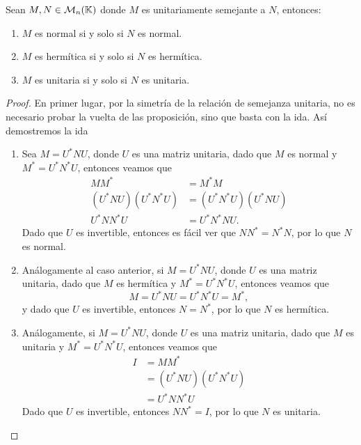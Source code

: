 \begin{teor}
  Sean $M,N \in \mathcal{M}_n(\mathbb{K})$ donde $M$ es unitariamente semejante a $N$, entonces:
  \begin{enumerate}
    \item $M$ es normal si y solo si $N$ es normal.
    \item $M$ es hermítica si y solo si $N$ es hermítica.
    \item $M$ es unitaria si y solo si $N$ es unitaria.
  \end{enumerate}
\end{teor}
\begin{proof}
  En primer lugar, por la simetría de la relación de semejanza unitaria, no es necesario probar la vuelta de las proposición, sino que basta con la ida. Así demostremos la ida
  \begin{enumerate}
    \item Sea $M = U^* N U$, donde $U$ es una matriz unitaria, dado que $M$ es normal y $M^* = U^* N^* U$, entonces veamos que
      \begin{align*}
        MM^* &= M^* M \\
        (U^* N U)(U^* N^* U) &= (U^* N^* U)(U^* N U) \\
        U^* N N^* U &= U^* N^* N U.
      \end{align*}
    Dado que $U$ es invertible, entonces es fácil ver que $NN^* = N^* N$, por lo que $N$ es normal.

    \item Análogamente al caso anterior, si $M = U^* N U$, donde $U$ es una matriz unitaria, dado que $M$ es hermítica y $M^* = U^* N^* U$, entonces veamos que
      \[ M =  U^* N U = U^* N^* U = M^*, \]
    y dado que $U$ es invertible, entonces $N = N^*$, por lo que $N$ es hermítica.

    \item Análogamente, si $M = U^* N U$, donde $U$ es una matriz unitaria, dado que $M$ es unitaria y $M^* = U^* N^* U$, entonces veamos que
    \begin{align*}
      I &= MM^*  \\
      &= (U^* N U)(U^* N^* U)  \\
      &= U^* N N^* U 
    \end{align*}
  Dado que $U$ es invertible, entonces $NN^* = I$, por lo que $N$ es unitaria. \qedhere
  \end{enumerate}
\end{proof}